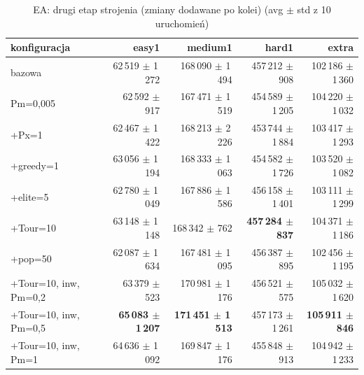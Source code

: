 \begin{table}[H]
  \centering
  \small
  \caption{EA: drugi etap strojenia (zmiany dodawane po kolei) (avg $\pm$ std z 10 uruchomień)}
  \label{tab:ea-kombinacje}
  \begin{tabular}{lrrrr}
    \toprule
    konfiguracja & easy1 & medium1 & hard1 & extra \\
    \midrule
    bazowa & 62\,519 $\pm$ 1\,272 & 168\,090 $\pm$ 1\,494 & 457\,212 $\pm$ 908 & 102\,186 $\pm$ 1\,360 \\
    Pm=0{,}005 & 62\,592 $\pm$ 917 & 167\,471 $\pm$ 1\,519 & 454\,589 $\pm$ 1\,205 & 104\,220 $\pm$ 1\,032 \\
    +Px=1 & 62\,467 $\pm$ 1\,422 & 168\,213 $\pm$ 2\,226 & 453\,744 $\pm$ 1\,884 & 103\,417 $\pm$ 1\,293 \\
    +greedy=1 & 63\,056 $\pm$ 1\,194 & 168\,333 $\pm$ 1\,063 & 454\,582 $\pm$ 1\,726 & 103\,520 $\pm$ 1\,082 \\
    +elite=5 & 62\,780 $\pm$ 1\,049 & 167\,886 $\pm$ 1\,586 & 456\,158 $\pm$ 1\,401 & 103\,111 $\pm$ 1\,299 \\
    +Tour=10 & 63\,148 $\pm$ 1\,148 & 168\,342 $\pm$ 762 & \textbf{457\,284 $\pm$ 837} & 104\,371 $\pm$ 1\,186 \\
    +pop=50 & 62\,087 $\pm$ 1\,634 & 167\,481 $\pm$ 1\,095 & 456\,387 $\pm$ 895 & 102\,456 $\pm$ 1\,195 \\
    +Tour=10, inw{,} Pm=0{,}2 & 63\,379 $\pm$ 523 & 170\,981 $\pm$ 1\,176 & 456\,521 $\pm$ 575 & 105\,032 $\pm$ 1\,620 \\
    +Tour=10, inw{,} Pm=0{,}5 & \textbf{65\,083 $\pm$ 1\,207} & \textbf{171\,451 $\pm$ 1\,513} & 457\,173 $\pm$ 1\,261 & \textbf{105\,911 $\pm$ 846} \\
    +Tour=10, inw{,} Pm=1 & 64\,636 $\pm$ 1\,092 & 169\,847 $\pm$ 1\,176 & 455\,848 $\pm$ 913 & 104\,942 $\pm$ 1\,233 \\
    \bottomrule
  \end{tabular}
\end{table}

